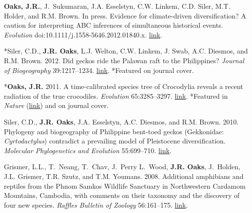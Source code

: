 \documentclass[10pt]{article}
\begin{document}
%
\begin{thebibliography}{6}
\providecommand{\natexlab}[1]{#1}
\providecommand{\url}[1]{\texttt{#1}}
\providecommand{\urlprefix}{URL }

{\bf Oaks, J.R.}, J.~Sukumaran, J.A. Esselstyn, C.W. Linkem, C.D. Siler, M.T.
  Holder, and R.M. Brown. In press.
\newblock Evidence for climate-driven diversification? A caution for
  interpreting {ABC} inferences of simultaneous historical events.
\newblock \emph{Evolution} doi:10.1111/j.1558-5646.2012.01840.x.
\newblock
  \href{http://onlinelibrary.wiley.com/doi/10.1111/j.1558-5646.2012.01840.x/abstract}{link}.

*Siler, C.D., {\bf J.R. Oaks}, L.J. Welton, C.W. Linkem, J. Swab, A.C. Diesmos,
  and R.M. Brown. 2012.
\newblock Did geckos ride the {P}alawan raft to the {P}hilippines?
\newblock \emph{Journal of Biogeography} 39:1217--1234.
\newblock
  \href{http://onlinelibrary.wiley.com/doi/10.1111/j.1365-2699.2011.02680.x/abstract}{link}.
  *Featured on journal cover.

*{\bf Oaks, J.R.} 2011.
\newblock A time-calibrated species tree of {C}rocodylia reveals a recent
  radiation of the true crocodiles.
\newblock \emph{Evolution} 65:3285--3297.
\newblock
  \href{http://onlinelibrary.wiley.com/doi/10.1111/j.1558-5646.2011.01373.x/abstract}{link}.
  *Featured in \emph{Nature}
  (\href{http://www.nature.com/nature/journal/v474/n7353/full/474545a.html}{link})
  and on journal cover.

Siler, C.D., {\bf J.R. Oaks}, J.A. Esselstyn, A.C. Diesmos, and R.M. Brown.
  2010.
\newblock Phylogeny and biogeography of {P}hilippine bent-toed geckos
  ({G}ekkonidae: \emph{{C}yrtodactylus}) contradict a prevailing model of
  {P}leistocene diversification.
\newblock \emph{Molecular Phylogenetics and Evolution} 55:699--710.
\newblock
  \href{http://www.sciencedirect.com/science/article/pii/S1055790310000382}{link}.

Grismer, L.L., T.~Neang, T.~Chav, J.~Perry L.~Wood, {\bf J.R. Oaks}, J.~Holden,
  J.L. Grismer, T.R. Szutz, and T.M. Youmans. 2008.
\newblock Additional amphibians and reptiles from the {P}hnom {S}amkos
  {W}ildlife {S}anctuary in {N}orthwestern {C}ardamom {M}ountains, {C}ambodia,
  with comments on their taxonomy and the discovery of four new species.
\newblock \emph{Raffles Bulletin of Zoology} 56:161--175.
\newblock
  \href{http://rmbr.nus.edu.sg/rbz/biblio/56/56rbz161-175.pdf}{link}.


\end{thebibliography}
\end{document}
